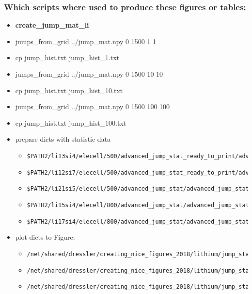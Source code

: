 \documentclass{article}
\begin{document}
\subsubsection{Which scripts where used to produce these figures or tables:}
\begin{itemize}
  \item \textbf{create\_jump\_mat\_li}
  \item jumps\_from\_grid ../jump\_mat.npy 0 1500 1 1
  \item cp jump\_hist.txt jump\_hist\_1.txt
  \item jumps\_from\_grid ../jump\_mat.npy 0 1500 10 10
  \item cp jump\_hist.txt jump\_hist\_10.txt
   \item jumps\_from\_grid ../jump\_mat.npy 0 1500 100 100
\item cp jump\_hist.txt jump\_hist\_100.txt
  \item prepare dicts with statistic data
  \begin{itemize}
    \item  \begin{verbatim}$PATH2/li13si4/elecell/500/advanced_jump_stat_ready_to_print/advanced_jump_stat_ready_to_print.py\end{verbatim}
  \item  \begin{verbatim}$PATH2/li12si7/elecell/500/advanced_jump_stat_ready_to_print/advanced_jump_stat_ready_to_print.py\end{verbatim}
  \item  \begin{verbatim}$PATH2/li21si5/elecell/500/advanced_jump_stat/advanced_jump_stat_ready_to_print.py\end{verbatim}
  \item  \begin{verbatim}$PATH2/li15si4/elecell/800/advanced_jump_stat/advanced_jump_stat_ready_to_print.py\end{verbatim}
    \item  \begin{verbatim}$PATH2/li17si4/elecell/800/advanced_jump_stat/advanced_jump_stat_ready_to_print.py\end{verbatim}
  \end{itemize}
  \item plot dicts to Figure:
  \begin{itemize}
  \item  \begin{verbatim}/net/shared/dressler/creating_nice_figures_2018/lithium/jump_stat2/plot_dict1.py\end{verbatim}
  \item  \begin{verbatim}/net/shared/dressler/creating_nice_figures_2018/lithium/jump_stat2/plot_dict_avg_std.py\end{verbatim}
  \item  \begin{verbatim}/net/shared/dressler/creating_nice_figures_2018/lithium/jump_stat2/test.py\end{verbatim}
  \end{itemize}
  \end{itemize}
\end{document}
